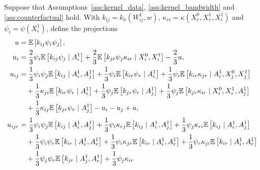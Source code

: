 \begin{lemma}
  \label{lem:counterfactual_hoeffding}

  Suppose that Assumptions~\ref{ass:kernel_data},
  \ref{ass:kernel_bandwidth} and
  \ref{ass:counterfactual} hold.
  With $k_{i j} = k_h(W_{i j}^1, w)$,
  $\kappa_{r i} = \kappa(X_r^0, X_r^1, X_i^1)$
  and $\psi_i = \psi(X_i^1)$, define the projections
  \begin{align*}
    u
    &=
    \E\left[
      k_{i j}
      \psi_i
      \psi_j
    \right], \\
    u_i
    &=
    \frac{2}{3} \psi_i
    \E\left[
      k_{i j}
      \psi_j
    \mid A_i^1 \right]
    +
    \frac{2}{3} \E\left[
      k_{jr}
      \psi_j \kappa_{i r}
    \mid X_i^0, X_i^1 \right]
    - \frac{2}{3} u, \\
    u_{i j}
    &=
    \frac{1}{3}
    \psi_i
    \psi_j
    \E\left[
      k_{i j}
    \mid A_i^1, A_j^1 \right]
    +
    \frac{1}{3}
    \psi_i
    \E\left[
      k_{i r} \psi_r
    \mid A_i^1 \right]
    +
    \frac{1}{3}
    \psi_i
    \E\left[
      k_{i r}  \kappa_{jr}
    \mid A_i^1, X_j^0, X_j^1 \right] \\
    &\quad+
    \frac{1}{3}
    \kappa_{j i}
    \E\left[
      k_{i r} \psi_r
    \mid A_i^1 \right]
    + \frac{1}{3}
    \psi_j
    \E\left[
      k_{jr}  \psi_r
    \mid A_j^1 \right]
    +
    \frac{1}{3}
    \psi_j
    \E\left[
      k_{jr}  \kappa_{i r}
    \mid X_i^0, X_i^1, A_j^1 \right] \\
    &\quad+
    \frac{1}{3}
    \kappa_{i j}
    \E\left[
      k_{jr} \psi_r
    \mid A_j^1 \right]
    - u_i - u_j + u, \\
    u_{i j r}
    &=
    \frac{1}{3}
    \psi_i \psi_j
    \E\left[
      k_{i j}
    \mid A_i^1, A_j^1 \right]
    +
    \frac{1}{3}
    \psi_i \kappa_{r j}
    \E\left[
      k_{i j}
    \mid A_i^1, A_j^1 \right]
    +
    \frac{1}{3}
    \psi_j \kappa_{r i}
    \E\left[
      k_{i j}
    \mid A_i^1, A_j^1 \right] \\
    &\quad+
    \frac{1}{3}
    \psi_i \psi_r
    \E\left[
      k_{i r}
    \mid A_i^1, A_r^1 \right]
    + \frac{1}{3}
    \psi_i \kappa_{jr}
    \E\left[
      k_{i r}
    \mid A_i^1, A_r^1 \right]
    +
    \frac{1}{3}
    \psi_r \kappa_{j i}
    \E\left[
      k_{i r}
    \mid A_i^1, A_r^1 \right] \\
    &\quad+
    \frac{1}{3}
    \psi_j \psi_r
    \E\left[
      k_{jr}
    \mid A_j^1, A_r^1 \right]
    + \frac{1}{3}
    \psi_j \kappa_{i r}

\end{align*}
\end{lemma}
